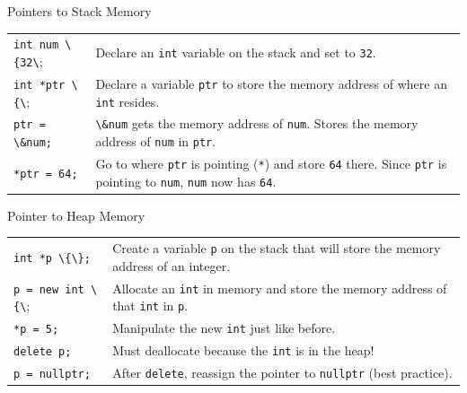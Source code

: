 \documentclass[14pt,aspectratio=1610]{beamer}
\begin{document}
\begin{frame}[fragile]{Pointers to Stack Memory}
\renewcommand{\arraystretch}{1.5}
\begin{tabularx}{1\textwidth}{>{\columncolor{codeBackground}}l >{\small}X}
  \lstinline{int num \{32\};} & Declare an \lstinline{int} variable on the stack and set to \lstinline{32}.
    \\
  \lstinline{int *ptr \{\};}   & Declare a variable \lstinline{ptr} to store the memory address of where an \lstinline{int} resides.
    \\
  \lstinline{ptr = \&num;}   & \lstinline{\&num} gets the memory address of \lstinline{num}.\newline
  Stores the memory address of \lstinline{num} in \lstinline{ptr}.
    \\
  \lstinline{*ptr = 64;}  & Go to where \lstinline{ptr} is pointing (\lstinline{*}) and store \lstinline{64} there.\newline
  Since \lstinline{ptr} is pointing to \lstinline{num}, \lstinline{num} now has \lstinline{64}.\onslide\\
\end{tabularx}

\end{frame}

\begin{frame}{Pointer to Heap Memory}
\renewcommand{\arraystretch}{1.5}
\begin{tabularx}{1\textwidth}{>{\columncolor{codeBackground}}l >{\small}X}
  \lstinline|int *p \{\};|
    & Create a variable \lstinline{p} on the stack that will \newline{} store the memory address of an integer.\\
  \lstinline{p = new int \{\};}
    & Allocate an \lstinline{int} in memory and store the memory address of that \lstinline{int} in \lstinline{p}.\\
  \lstinline{*p = 5;}
    & Manipulate the new \lstinline{int} just like before.\\
  \lstinline{delete p;}
    & Must deallocate because the \lstinline{int} is in the heap!\\
  \lstinline{p = nullptr;}
    & After \lstinline{delete}, reassign the pointer to \lstinline{nullptr} (best practice).\onslide\\
\end{tabularx}
\end{frame}
\end{document}
